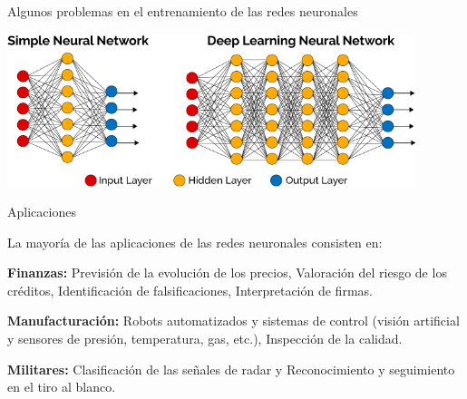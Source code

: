 \documentclass[
  ignorenonframetext,
]{beamer}
\begin{document}
\begin{frame}{Algunos problemas en el entrenamiento de las redes
neuronales}
\begin{block}{}
\includegraphics[width=4.6875in,height=\textheight]{simple_profunda.png}

\end{block}

\end{frame}

\begin{frame}{Aplicaciones}
\protect\hypertarget{aplicaciones}{}

\begin{block}{}

La mayoría de las aplicaciones de las redes neuronales consisten en:

\textbf{Finanzas:} Previsión de la evolución de los precios, Valoración
del riesgo de los créditos, Identificación de falsificaciones,
Interpretación de firmas.

\textbf{Manufacturación:} Robots automatizados y sistemas de control
(visión artificial y sensores de presión, temperatura, gas, etc.),
Inspección de la calidad.

\textbf{Militares:} Clasificación de las señales de radar y
Reconocimiento y seguimiento en el tiro al blanco.

\end{block}

\end{frame}
\end{document}
